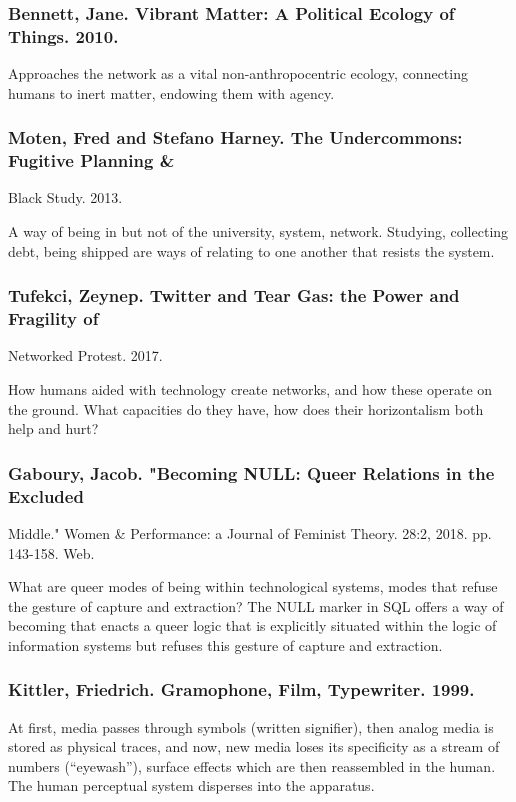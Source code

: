 \documentclass[11pt]{article}
\begin{document}
\subsubsection{Bennett, Jane. Vibrant Matter: A Political Ecology of Things. 2010.}
\label{sec:orga2f358b}

Approaches the network as a vital non-anthropocentric ecology,
connecting humans to inert matter, endowing them with agency.

\subsubsection{Moten, Fred and Stefano Harney. The Undercommons: Fugitive Planning \&}
\label{sec:org88ec4f0}
Black Study. 2013.

A way of being in but not of the university, system,
network. Studying, collecting debt, being shipped are ways of relating
to one another that resists the system.

\subsubsection{Tufekci, Zeynep. Twitter and Tear Gas: the Power and Fragility of}
\label{sec:orgc33d6aa}
Networked Protest. 2017.

How humans aided with technology create networks, and how these
operate on the ground. What capacities do they have, how does their
horizontalism both help and hurt?

\subsubsection{Gaboury, Jacob. "Becoming NULL: Queer Relations in the Excluded}
\label{sec:orga37fc1b}
Middle." Women \& Performance: a Journal of Feminist
Theory. 28:2, 2018. pp. 143-158. Web.

What are queer modes of being within technological systems, modes that
refuse the gesture of capture and extraction? The NULL marker in SQL
offers a way of becoming that enacts a queer logic that is explicitly
situated within the logic of information systems but refuses this
gesture of capture and extraction.

\subsubsection{Kittler, Friedrich. Gramophone, Film, Typewriter. 1999.}
\label{sec:org213822f}

At first, media passes through symbols (written signifier), then
analog media is stored as physical traces, and now, new media loses
its specificity as a stream of numbers (“eyewash”), surface effects
which are then reassembled in the human. The human perceptual system
disperses into the apparatus.
\end{document}
